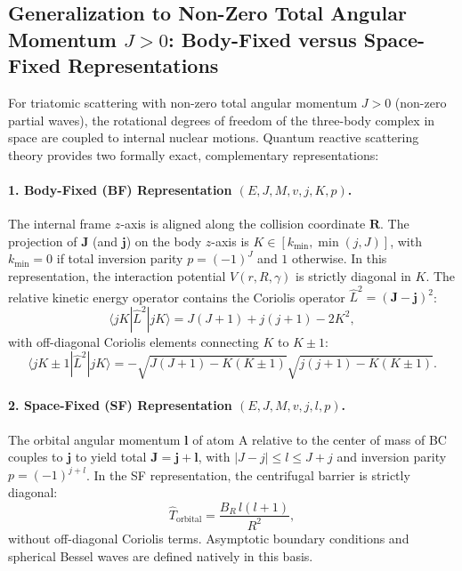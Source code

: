 \documentclass[11pt,a4paper]{article}
\begin{document}
\subsection{Generalization to Non-Zero Total Angular Momentum $J > 0$: Body-Fixed versus Space-Fixed Representations}
\label{sec:j_greater_than_zero}

For triatomic scattering with non-zero total angular momentum $J > 0$ (non-zero partial waves),
the rotational degrees of freedom of the three-body complex in space are coupled to internal nuclear motions.
Quantum reactive scattering theory provides two formally exact, complementary representations:

\paragraph{1. Body-Fixed (BF) Representation $(E, J, M, v, j, K, p)$.}
The internal frame $z$-axis is aligned along the collision coordinate $\mathbf{R}$.
The projection of $\mathbf{J}$ (and $\mathbf{j}$) on the body $z$-axis is $K \in [k_{\min}, \min(j, J)]$,
with $k_{\min} = 0$ if total inversion parity $p = (-1)^J$ and $1$ otherwise.
In this representation, the interaction potential $V(r, R, \gamma)$ is strictly diagonal in $K$.
The relative kinetic energy operator contains the Coriolis operator $\hat L^2 = (\mathbf{J} - \mathbf{j})^2$:
\begin{equation}
 \langle j K | \hat L^2 | j K \rangle = J(J+1) + j(j+1) - 2 K^2 ,
\end{equation}
with off-diagonal Coriolis elements connecting $K$ to $K \pm 1$:
\begin{equation}
 \langle j K \pm 1 | \hat L^2 | j K \rangle = -\sqrt{J(J+1) - K(K \pm 1)} \sqrt{j(j+1) - K(K \pm 1)} .
\end{equation}

\paragraph{2. Space-Fixed (SF) Representation $(E, J, M, v, j, l, p)$.}
The orbital angular momentum $\mathbf{l}$ of atom A relative to the center of mass of BC couples to
$\mathbf{j}$ to yield total $\mathbf{J} = \mathbf{j} + \mathbf{l}$, with $|J - j| \le l \le J + j$ and
inversion parity $p = (-1)^{j+l}$. In the SF representation, the centrifugal barrier is strictly
diagonal:
\begin{equation}
 \hat T_{\mathrm{orbital}} = \frac{B_R \, l(l+1)}{R^2} ,
\end{equation}
without off-diagonal Coriolis terms. Asymptotic boundary conditions and spherical Bessel waves
are defined natively in this basis.
\end{document}
